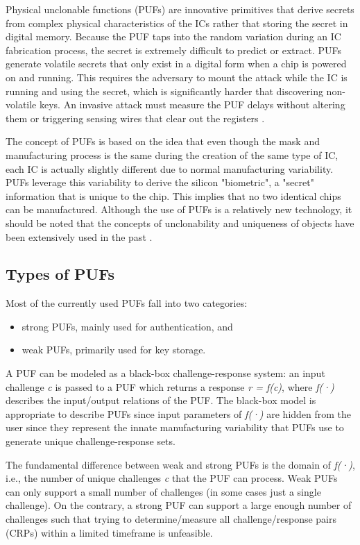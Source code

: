 Physical unclonable functions (PUFs) are innovative primitives that derive secrets from complex physical characteristics of the ICs rather that storing the secret in digital memory. Because the PUF taps into the random variation during an IC fabrication process, the secret is extremely difficult to predict or extract. PUFs generate volatile secrets that only exist in a digital form when a chip is powered on and running. This requires the adversary to mount the attack while the IC is running and using the secret, which is significantly harder that discovering non-volatile keys. An invasive attack must measure the PUF delays without altering them or triggering sensing wires that clear out the registers \cite{PUF_Suh_Devadas}.

The concept of PUFs is based on the idea that even though the mask and manufacturing process is the same during the creation of the same type of IC, each IC is actually slightly different due to normal manufacturing variability. PUFs leverage this variability to derive the silicon "biometric", a "secret" information that is unique to the chip. This implies that no two identical chips can be manufactured.  
Although the use of PUFs is a relatively new technology, it should be noted that the concepts of unclonability and uniqueness of objects have been extensively used in the past \cite{PUF_IEEE_Herder}.

\subsection{Types of PUFs}
Most of the currently used PUFs fall into two categories: 
\begin{itemize}
\item strong PUFs, mainly used for authentication, and 
\item weak PUFs, primarily used for key storage.
\end{itemize}

A PUF can be modeled as a black-box challenge-response system: an input challenge \emph{c} is passed to a PUF which returns a response \emph{r = f(c)}, where \emph{f(·)} describes the input/output relations of the PUF. The black-box model is appropriate to describe PUFs since input parameters of \emph{f(·)} are hidden from the user since they represent the innate manufacturing variability that PUFs use to generate unique challenge-response sets.

The fundamental difference between weak and strong PUFs is the domain of \emph{f(·)}, i.e., the number of unique challenges \emph{c} that the PUF can process. Weak PUFs can only support a small number of challenges (in some cases just a single challenge). On the contrary, a strong PUF can support a large enough number of challenges such that trying to determine/measure all challenge/response pairs (CRPs) within a limited timeframe is unfeasible.

